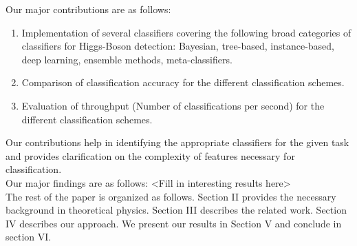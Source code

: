 Our major contributions are as follows:
\begin{enumerate}
\item	Implementation of several classifiers covering the following broad categories of classifiers for Higgs-Boson detection: Bayesian, tree-based, instance-based, deep learning, ensemble methods, meta-classifiers.
\item	Comparison of classification accuracy for the different classification schemes.
\item	Evaluation of throughput (Number of classifications per second) for the different classification schemes.
\end{enumerate}
Our contributions help in identifying the appropriate classifiers for the given task and provides clarification on the complexity of features necessary for classification. \\

Our major findings are as follows: <Fill in interesting results here> \\

The rest of the paper is organized as follows. Section II provides the necessary background in theoretical physics. Section III describes the related work. Section IV describes our approach. We present our results in Section V and conclude in section VI.

